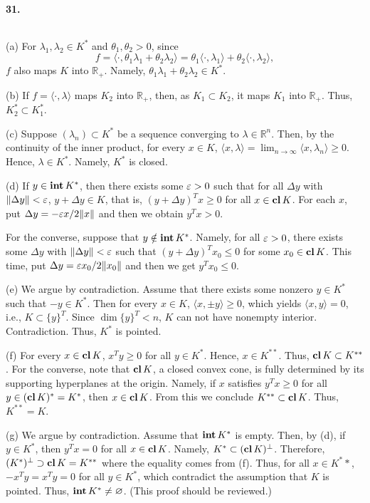  \paragraph{31.}
  \begin{solution}
    $\,$\par
    (a) For $\lambda_1,\lambda_2\in K^*$ and $\theta_1,\theta_2>0$, since
    \[
      f=\langle\cdot,\theta_1\lambda_1+\theta_2\lambda_2\rangle=
      \theta_1\langle\cdot,\lambda_1\rangle+
      \theta_2\langle\cdot,\lambda_2\rangle,
    \]
    $f$ also maps $K$ into $\mathbb{R}_+$. Namely, $\theta_1\lambda_1+\theta_2
    \lambda_2\in K^*$.\par
    (b) If $f=\langle\cdot,\lambda\rangle$ maps $K_2$ into $\mathbb{R}_+$, then,
    as $K_1\subset K_2$, it maps $K_1$ into $\mathbb{R}_+$. Thus, $K_2^*\subset
    K_1^*$.\par
    (c) Suppose $(\lambda_n)\subset K^*$ be a sequence converging to $\lambda\in
    \mathbb{R}^n$. Then, by the continuity of the inner product, for every $x
    \in K$, $\langle x,\lambda\rangle=\lim_{n\to\infty}\langle x,\lambda_n
    \rangle\ge 0$. Hence, $\lambda\in K^*$. Namely, $K^*$ is closed.\par
    (d) If $y\in\operatorname{\mathbf{int}} K^*$, then there exists some $\varepsilon>0$ such that for all 
    $\Delta y$ with $\|\Delta y\|<\varepsilon$, $y+\Delta y\in K$, that is, $(y+\Delta
    y)^Tx\ge 0$ for all $x\in\operatorname{\mathbf{cl}} K$. For each $x$, put $\Delta y=-\varepsilon x/
    2\|x\|$ and then we obtain $y^Tx>0$.\par
    For the converse, suppose that $y\notin\operatorname{\mathbf{int}} K^*$. Namely, for all $\varepsilon>0$,
    there exists some $\Delta y$ with $\|\Delta y\|<\varepsilon$ such that $(y+\Delta
    y)^Tx_0\le 0$ for some $x_0\in\operatorname{\mathbf{cl}} K$. This time, put $\Delta y=\varepsilon x_0/2
    \|x_0\|$ and then we get $y^Tx_0\le 0$.\par
    (e) We argue by contradiction. Assume that there exists some nonzero $y\in 
    K^*$ such that $-y\in K^*$. Then for every $x\in K$, $\langle x,\pm y\rangle
    \ge 0$, which yields $\langle x,y\rangle=0$, i.e., $K\subset\{y\}^T$. Since
    $\dim\{y\}^T<n$, $K$ can not have nonempty interior. Contradiction. Thus, 
    $K^*$ is pointed.\par
    (f) For every $x\in\operatorname{\mathbf{cl}} K$, $x^Ty\ge 0$ for all $y\in K^*$. Hence, $x\in K^{
    **}$. Thus, $\operatorname{\mathbf{cl}} K\subset K^{**}$. For the converse, note that $\operatorname{\mathbf{cl}} K$, a 
    closed convex cone, is fully determined by its supporting hyperplanes at the
    origin. Namely, if $x$ satisfies $y^Tx\ge 0$ for all $y\in(\operatorname{\mathbf{cl}} K)^*=K^*$, 
    then $x\in\operatorname{\mathbf{cl}} K$. From this we conclude $K^{**}\subset \operatorname{\mathbf{cl}} K$. Thus, $K^{**}
    =K$.\par
    (g) We argue by contradiction. Assume that $\operatorname{\mathbf{int}} K^*$ is empty. Then, by 
    (d), if $y\in K^*$, then $y^Tx=0$ for all $x\in\operatorname{\mathbf{cl}} K$. Namely, $K^*\subset
    (\operatorname{\mathbf{cl}} K)^\perp$. Therefore, $(K^*)^\perp\supset\operatorname{\mathbf{cl}} K=K^{**}$ where the 
    equality comes from (f). Thus, for all $x\in K^**$, $-x^Ty=x^Ty=0$ for all 
    $y\in K^*$, which contradict the assumption that $K$ is pointed. Thus, 
    $\operatorname{\mathbf{int}} K^*\ne\varnothing$. (This proof should be reviewed.)
  \end{solution}
  
